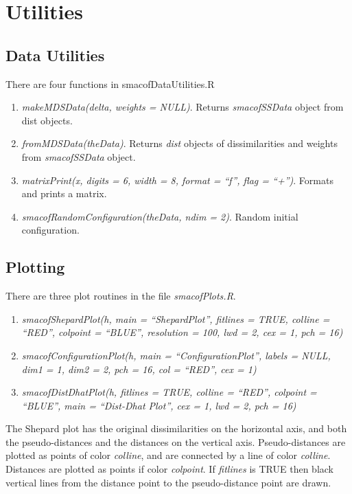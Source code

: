 \documentclass[
  12pt,
  letterpaper,
  DIV=11,
  numbers=noendperiod]{scrartcl}
\providecommand{\tightlist}{%
  \setlength{\itemsep}{0pt}\setlength{\parskip}{0pt}}
\begin{document}
\section{Utilities}\label{utilities}

\subsection{Data Utilities}\label{data-utilities}

There are four functions in smacofDataUtilities.R

\begin{enumerate}
\def\labelenumi{\arabic{enumi}.}
\tightlist
\item
  \emph{makeMDSData(delta, weights = NULL)}. Returns \emph{smacofSSData}
  object from dist objects.
\item
  \emph{fromMDSData(theData)}. Returns \emph{dist} objects of
  dissimilarities and weights from \emph{smacofSSData} object.
\item
  \emph{matrixPrint(x, digits = 6, width = 8, format = ``f'', flag =
  ``+'')}. Formats and prints a matrix.
\item
  \emph{smacofRandomConfiguration(theData, ndim = 2)}. Random initial
  configuration.
\end{enumerate}

\subsection{Plotting}\label{sec-plotting}

There are three plot routines in the file \emph{smacofPlots.R}.

\begin{enumerate}
\def\labelenumi{\arabic{enumi}.}
\tightlist
\item
  \emph{smacofShepardPlot(h, main = ``ShepardPlot'', fitlines = TRUE,
  colline = ``RED'', colpoint = ``BLUE'', resolution = 100, lwd = 2, cex
  = 1, pch = 16)}
\item
  \emph{smacofConfigurationPlot(h, main = ``ConfigurationPlot'', labels
  = NULL, dim1 = 1, dim2 = 2, pch = 16, col = ``RED'', cex = 1)}
\item
  \emph{smacofDistDhatPlot(h, fitlines = TRUE, colline = ``RED'',
  colpoint = ``BLUE'', main = ``Dist-Dhat Plot'', cex = 1, lwd = 2, pch
  = 16)}
\end{enumerate}

The Shepard plot has the original dissimilarities on the horizontal
axis, and both the pseudo-distances and the distances on the vertical
axis. Pseudo-distances are plotted as points of color \emph{colline},
and are connected by a line of color \emph{colline}. Distances are
plotted as points if color \emph{colpoint}. If \emph{fitlines} is TRUE
then black vertical lines from the distance point to the pseudo-distance
point are drawn.
\end{document}
